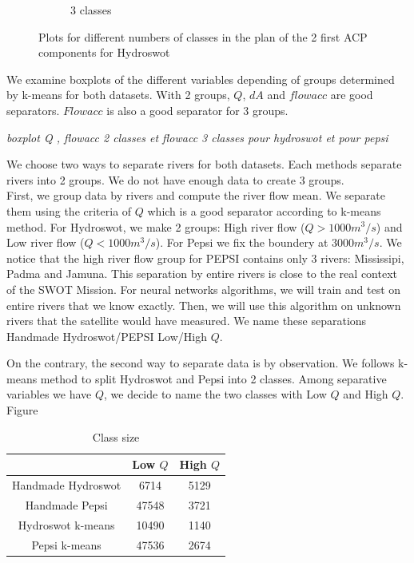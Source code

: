 \begin{figure}[H]
\begin{subfigure} {0.45 \textwidth}
        \caption{3 classes}
    \end{subfigure}
\caption{Plots for different numbers of classes in the plan of the 2 first ACP components for Hydroswot }
\label{fig:kmeans}
\end{figure}




We examine boxplots of the different variables depending of groups determined by k-means for both datasets. With 2 groups, $Q$, $dA$ and $flowacc$ are good separators. $Flowacc$ is also a good separator for 3 groups. 

\textit{boxplot Q , flowacc 2 classes et flowacc 3 classes pour hydroswot et pour pepsi}


We choose two ways to separate rivers for both datasets. Each methods separate rivers into 2 groups. We do not have enough data to create 3 groups. \\
First, we group data by rivers and compute the river flow mean. We separate them using the criteria of $Q$ which is a good separator according to k-means method. For Hydroswot, we make 2 groups: High river flow ($Q > 1000 m^3/s$) and Low river flow ($Q < 1000 m^3/s$). For Pepsi we fix the boundery at $3000 m^3/s$. We notice that the high river flow group for PEPSI contains only 3 rivers: Mississipi, Padma and Jamuna. This separation by entire rivers is close to the real context of the SWOT Mission. For neural networks algorithms, we will train and test on entire rivers that we know exactly. Then, we will use this algorithm on unknown rivers that the satellite would have measured. We name these separations Handmade Hydroswot/PEPSI Low/High $Q$. 

On the contrary, the second way to separate data is by observation. We follows k-means method to split Hydroswot and Pepsi into 2 classes. Among separative variables we have $Q$, we decide to name the two classes with Low $Q$ and High $Q$.  \\
Figure 
\begin{table}[H]
\centering
    \begin{tabular}{|c|c|c|}
    \hline
    & Low $Q$ & High $Q$ \\ \hline
    Handmade Hydroswot & 6714 & 5129 \\\hline
    Handmade Pepsi & 47548 & 3721 \\\hline
    Hydroswot k-means  &  10490 & 1140 \\\hline
    Pepsi k-means & 47536 & 2674\\ \hline
    \end{tabular}

\caption{Class size}
\label{Tab:Proportion of observations in classes}
\end{table}

